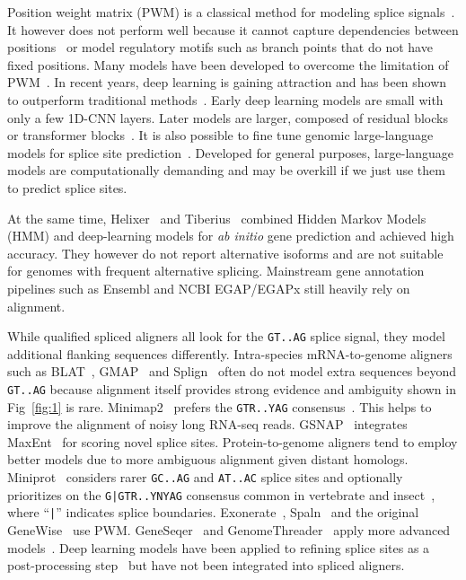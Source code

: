 \documentclass[webpdf,contemporary,large,namedate]{oup-authoring-template}%
\begin{document}
Position weight matrix (PWM) is a classical method for modeling splice signals~\citep{Staden:1984aa}.
It however does not perform well because it cannot capture dependencies between positions~\citep{Burge:1997uu}
or model regulatory motifs such as branch points that do not have fixed positions.
Many models have been developed to overcome the limitation of PWM~\citep{Capitanchik:2025aa}.
In recent years, deep learning is gaining attraction
and has been shown to outperform traditional methods~\citep{Zhang:2018aa,DBLP:journals/access/DuYDZZL18,Albaradei:2020aa}.
Early deep learning models are small with only a few 1D-CNN layers.
Later models are larger, composed of residual blocks~\citep{Jaganathan:2019aa,Zeng:2022aa,Xu:2024aa,Chao:2024aa} or transformer blocks~\citep{You:2024aa,Chen:2024aa}.
It is also possible to fine tune genomic large-language models for splice site prediction~\citep{Nguyen:2023aa,Dalla-Torre:2025aa,Brixi2025.02.18.638918}.
Developed for general purposes, large-language models are computationally demanding and may be overkill if we just use them to predict splice sites.

At the same time, Helixer~\citep{Holst2023.02.06.527280} and Tiberius~\citep{Gabriel:2024aa}
combined Hidden Markov Models (HMM) and deep-learning models for \emph{ab initio} gene prediction and achieved high accuracy.
They however do not report alternative isoforms and are not suitable for genomes with frequent alternative splicing.
Mainstream gene annotation pipelines such as Ensembl and NCBI EGAP/EGAPx still heavily rely on alignment.

While qualified spliced aligners all look for the {\tt GT..AG} splice signal,
they model additional flanking sequences differently.
Intra-species mRNA-to-genome aligners such as BLAT~\citep{Kent:2002jk}, GMAP~\citep{Wu:2005vn} and Splign~\citep{Kapustin:2008tq} often do not model extra sequences beyond {\tt GT..AG}
because alignment itself provides strong evidence and ambiguity shown in Fig~\ref{fig:1} is rare.
Minimap2~\citep{Li:2018ab} prefers the {\tt GTR..YAG} consensus~\citep{Irimia:2008aa}.
This helps to improve the alignment of noisy long RNA-seq reads.
GSNAP~\citep{Wu:2010uq} integrates MaxEnt~\citep{Yeo:2004aa} for scoring novel splice sites.
Protein-to-genome aligners tend to employ better models due to more ambiguous alignment given distant homologs.
Miniprot~\citep{Li:2023ab} considers rarer {\tt GC..AG} and {\tt AT..AC} splice sites and optionally prioritizes on the {\tt G|GTR..YNYAG} consensus
common in vertebrate and insect~\citep{Iwata:2011aa}, where ``{\tt |}'' indicates splice boundaries.
Exonerate~\citep{Slater:2005aa}, Spaln~\citep{Gotoh:2008aa,Iwata:2012aa,Gotoh:2024aa} and the original GeneWise~\citep{Birney:2004uy} use PWM.
GeneSeqer~\citep{Usuka:2000vi} and GenomeThreader~\citep{DBLP:journals/infsof/GremmeBSK05} apply more advanced models~\citep{Brendel:1998aa,Brendel:2004aa}.
Deep learning models have been applied to refining splice sites as a post-processing step~\citep{Chao:2024aa,Xia:2023aa}
but have not been integrated into spliced aligners.
\end{document}

